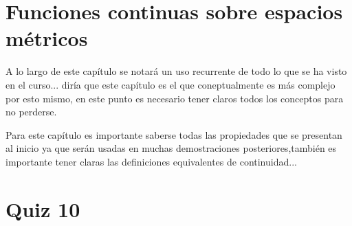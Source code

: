 
\section{Funciones continuas sobre espacios métricos}

A lo largo de este capítulo se notará un uso recurrente de todo lo que se ha visto en el curso... diría que este capítulo es el que coneptualmente es más complejo por esto mismo, en este punto es necesario tener claros todos los conceptos para no perderse.

\begin{note}
Para este capítulo es importante saberse todas las propiedades que se presentan al inicio ya que serán usadas en muchas demostraciones posteriores,también es importante tener claras las definiciones equivalentes de continuidad...
\end{note}

\section{Quiz 10}



